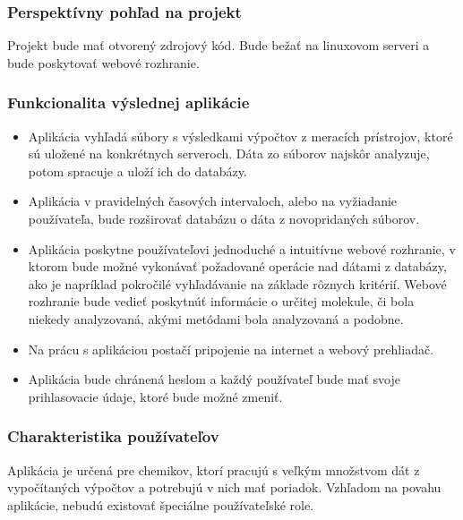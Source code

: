 \documentclass[12pt,a4paper]{article}
\begin{document}
\subsubsection{Perspektívny pohľad na projekt}
Projekt bude mať otvorený zdrojový kód. Bude bežať na linuxovom serveri a bude poskytovať webové rozhranie.

\subsubsection{Funkcionalita výslednej aplikácie}
\begin{itemize}
	\item Aplikácia vyhľadá súbory s výsledkami výpočtov z meracích prístrojov, ktoré sú uložené na konkrétnych serveroch. Dáta zo súborov najskôr analyzuje, potom spracuje a uloží ich do databázy.
	\item Aplikácia v pravidelných časových intervaloch, alebo na vyžiadanie používateľa, bude rozširovať databázu o dáta z novopridaných súborov.
	\item Aplikácia poskytne používateľovi jednoduché a intuitívne webové rozhranie, v ktorom bude možné vykonávať požadované operácie nad dátami z databázy, ako je napríklad pokročilé vyhľadávanie na základe rôznych kritérií. Webové rozhranie bude vedieť poskytnúť informácie o určitej molekule, či bola niekedy analyzovaná, akými metódami bola analyzovaná a podobne.
	\item Na prácu s aplikáciou postačí pripojenie na internet a webový prehliadač.
	\item Aplikácia bude chránená heslom a každý používateľ bude mať svoje prihlasovacie údaje, ktoré bude možné zmeniť.
\end{itemize}

\subsubsection{Charakteristika používateľov}
Aplikácia je určená pre chemikov, ktorí pracujú s veľkým množstvom dát z vypočítaných výpočtov a potrebujú v nich mať poriadok. Vzhľadom na povahu aplikácie, nebudú existovať špeciálne používateľské role.
\end{document}
